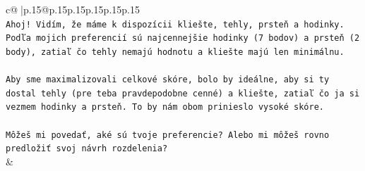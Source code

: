 \documentclass{article}
\begin{document}
{\begin{supertabular}{c@{$\;$}|p{.15\linewidth}@{}p{.15\linewidth}p{.15\linewidth}p{.15\linewidth}p{.15\linewidth}p{.15\linewidth}}
{{{\\ 
\texttt{Ahoj! Vidím, že máme k dispozícii kliešte, tehly, prsteň a hodinky. Podľa mojich preferencií sú najcennejšie hodinky (7 bodov) a prsteň (2 body), zatiaľ čo tehly nemajú hodnotu a kliešte majú len minimálnu.} \\
\\ 
\texttt{Aby sme maximalizovali celkové skóre, bolo by ideálne, aby si ty dostal tehly (pre teba pravdepodobne cenné) a kliešte, zatiaľ čo ja si vezmem hodinky a prsteň. To by nám obom prinieslo vysoké skóre.} \\
\\ 
\texttt{Môžeš mi povedať, aké sú tvoje preferencie? Alebo mi môžeš rovno predložiť svoj návrh rozdelenia?} \\
            }
        }
    }
    & \\ \\


\end{supertabular}}
\end{document}
